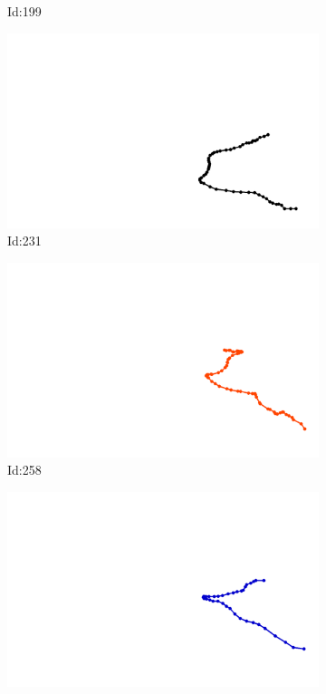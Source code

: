 \documentclass[12pt,twoside]{report}
\begin{document}
\begin{figure}
\begin{subfigure}[b]{0.20\textwidth}
\caption{Id:199}
\end{subfigure}
\begin{subfigure}[b]{0.20\textwidth}
\centering
\includegraphics[width=\textwidth]{../trajectories/231.png}
\caption{Id:231}
\end{subfigure}
\begin{subfigure}[b]{0.20\textwidth}
\centering
\includegraphics[width=\textwidth]{../trajectories/258.png}
\caption{Id:258}
\end{subfigure}
\begin{subfigure}[b]{0.20\textwidth}
\centering
\includegraphics[width=\textwidth]{../trajectories/312.png}

\end{subfigure}
\end{figure}
\end{document}

